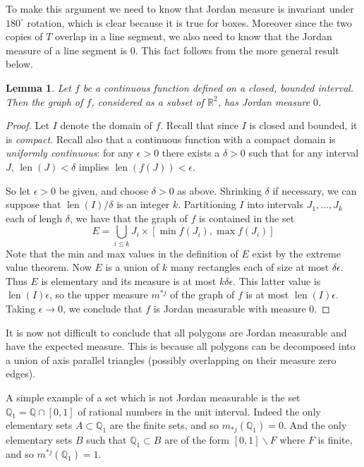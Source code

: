 \documentclass[11pt,oneside]{amsbook}
\renewcommand{\setminus}{\smallsetminus}
\newcommand{\QQ}{{\mathbb Q}}
\newcommand{\RR}{{\mathbb R}}
\DeclareMathOperator{\len}{len}
\theoremstyle{definition}
\theoremstyle{plain}
\newtheorem{lem}[thm]{Lemma}
\theoremstyle{definition}
\theoremstyle{remark}
\numberwithin{equation}{section}
\numberwithin{figure}{section}
\begin{document}
To make this argument we need to know that Jordan measure is invariant under $180^\circ$ rotation, which is clear because it is true for boxes. Moreover since the two copies of $T$ overlap in a line segment, we also need to know that the Jordan measure of a line segment is $0$. This fact follows from the more general result below.


\begin{lem}
  \label{lem:jordan-graph}
  Let $f$ be a continuous function defined on a closed, bounded interval. Then the graph of $f$, considered as a subset of $\RR^2$, has Jordan measure $0$.
\end{lem}

\begin{proof}
  Let $I$ denote the domain of $f$. Recall that since $I$ is closed and bounded, it is \emph{compact}. Recall also that a continuous function with a compact domain is \emph{uniformly continuous}: for any $\epsilon>0$ there exists a $\delta>0$ such that for any interval $J$, $\len(J)<\delta$ implies $\len(f(J))<\epsilon$.

  So let $\epsilon>0$ be given, and choose $\delta>0$ as above. Shrinking $\delta$ if necessary, we can suppose that $\len(I)/\delta$ is an integer $k$. Partitioning $I$ into intervals $J_1,\ldots,J_k$ each of lengh $\delta$, we have that the graph of $f$ is contained in the set
  \[E=\bigcup_{i\leq k} J_i\times[\min f(J_i),\max f(J_i)]
  \]
  Note that the min and max values in the definition of $E$ exist by the extreme value theorem. Now $E$ is a union of $k$ many rectangles each of size at most $\delta\epsilon$. Thus $E$ is elementary and its measure is at most $k\delta\epsilon$. This latter value is $\len(I)\epsilon$, so the upper measure $m^{*j}$ of the graph of $f$ is at most $\len(I)\epsilon$. Taking $\epsilon\to0$, we conclude that $f$ is Jordan measurable with measure $0$.
\end{proof}

It is now not difficult to conclude that all polygons are Jordan measurable and have the expected measure. This is because all polygons can be decomposed into a union of axis parallel triangles (possibly overlapping on their measure zero edges).

A simple example of a set which is not Jordan measurable is the set $\QQ_1=\QQ\cap[0,1]$ of rational numbers in the unit interval. Indeed the only elementary sets $A\subset\QQ_1$ are the finite sets, and so $m_{*j}(\QQ_1)=0$. And the only elementary sets $B$ such that $\QQ_1\subset B$ are of the form $[0,1]\setminus F$ where $F$ is finite, and so $m^{*j}(\QQ_1)=1$.
\end{document}
